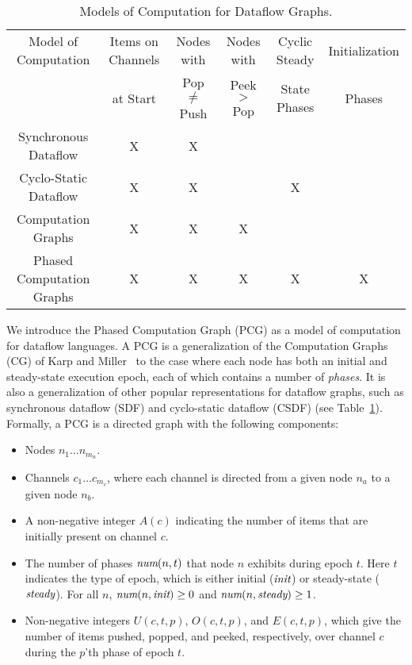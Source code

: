 \begin{table}[t]
\small
\begin{center}
\begin{tabular}{|c|c|c|c|c|c|} \hline
Model of Computation & Items on Channels & Nodes with & Nodes with & Cyclic Steady & Initialization \\
                     & at Start & Pop $\ne$ Push & Peek $>$ Pop & State Phases & Phases \\
\hline \hline
Synchronous Dataflow \cite{LM87} & X & X & & & \\
\hline
Cyclo-Static Dataflow \cite{BELP96} & X & X & & X & \\
\hline
Computation Graphs \cite{KM66} & X & X & X & & \\
\hline
Phased Computation Graphs & X & X & X & X & X \\
\hline
\end{tabular}
\vspace{-6pt}
\caption{\protect\small Models of Computation for Dataflow Graphs.}
\label{tab:models}
\vspace{-12pt}
\end{center}
\end{table}

We introduce the Phased Computation Graph (PCG) as a model of
computation for dataflow languages.  A PCG is a generalization of the
Computation Graphs (CG) of Karp and Miller~\cite{KM66} to the case
where each node has both an initial and steady-state execution epoch,
each of which contains a number of {\it phases}.  It is also a
generalization of other popular representations for dataflow graphs,
such as synchronous dataflow (SDF) and cyclo-static dataflow (CSDF)
(see Table~\ref{tab:models}).  Formally, a PCG is a directed graph
with the following components:
\begin{itemize}

\item Nodes $n_1 \dots n_{m_n}$.

\item Channels $c_1 \dots c_{m_c}$, where each channel is directed
from a given node $n_a$ to a given node $n_b$.

\item A non-negative integer $A(c)$ indicating the number of items
  that are initially present on channel $c$.

\item The number of phases $\mbox{\it num}(n, t)$ that node $n$ exhibits
during epoch $t$.  Here $t$ indicates the type of epoch, which is
either initial ($\mbox{\it init}$) or steady-state ($\mbox{\it steady}$).  For all
$n$, $\mbox{\it num}(n, \mbox{\it init}) \ge 0$ and $\mbox{\it num}(n, \mbox{\it steady}) \ge
1$.

\item Non-negative integers $U(c, t, p)$, $O(c, t, p)$, and $E(c, t,
p)$, which give the number of items pushed, popped, and peeked,
respectively, over channel $c$ during the $p$'th phase of epoch $t$.

\end{itemize}

